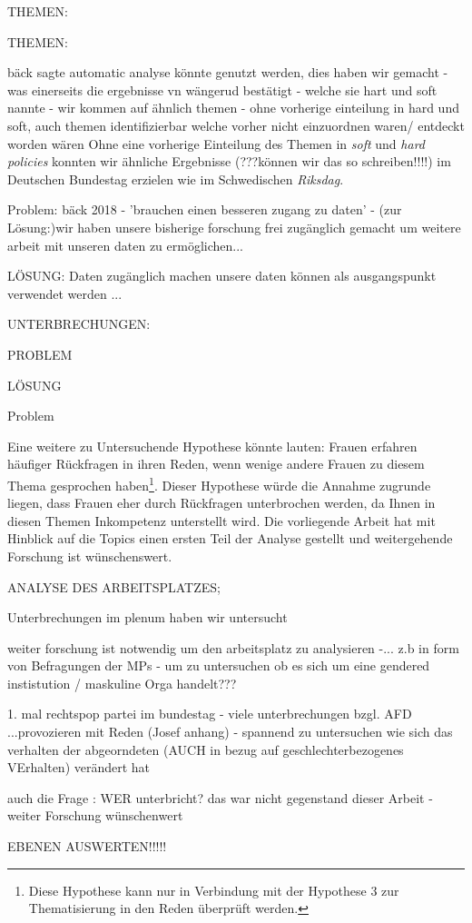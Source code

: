 \documentclass[12pt, 
    twoside=false, 
    bibliography=totoc, 
    numbers=endperiod, 
    headings=normal, 
    toc=chapterentrydotfill
    ]{scrbook}
\begin{document}
{THEMEN: 

THEMEN: 


bäck sagte automatic analyse könnte genutzt werden, dies haben wir gemacht - was einerseits die ergebnisse vn wängerud bestätigt - welche sie hart und soft nannte - wir kommen auf ähnlich themen - ohne vorherige einteilung in hard und soft, auch themen identifizierbar welche vorher nicht einzuordnen waren/ entdeckt worden wären
Ohne eine vorherige Einteilung des Themen in \emph{soft} und \emph{hard policies} konnten wir ähnliche Ergebnisse (???können wir das so schreiben!!!!) im Deutschen Bundestag erzielen wie \textcites[505]{back_2014} im Schwedischen \emph{Riksdag}\parencite[vgl. auch][]{wangnerud_1996}. 





Problem:
bäck 2018 - 'brauchen einen besseren zugang zu daten' - (zur Lösung:)wir haben unsere bisherige forschung frei zugänglich gemacht um weitere arbeit mit unseren daten zu ermöglichen... 

LÖSUNG:
Daten zugänglich machen 
unsere daten können als ausgangspunkt verwendet werden ... 



UNTERBRECHUNGEN:

PROBLEM

LÖSUNG 

Problem

Eine weitere zu Untersuchende Hypothese könnte lauten: {Frauen erfahren häufiger Rückfragen in ihren Reden, wenn wenige andere Frauen zu diesem Thema gesprochen haben}\footnote{Diese Hypothese kann nur in Verbindung mit der Hypothese 3 zur Thematisierung in den Reden überprüft werden.}. Dieser Hypothese würde die Annahme zugrunde liegen, dass Frauen eher durch Rückfragen unterbrochen werden, da Ihnen in diesen Themen Inkompetenz unterstellt wird. Die vorliegende Arbeit hat mit Hinblick auf die Topics einen ersten Teil der Analyse gestellt und weitergehende Forschung ist wünschenswert.


ANALYSE DES ARBEITSPLATZES; 

 Unterbrechungen im plenum haben wir untersucht  

weiter forschung ist notwendig um den arbeitsplatz zu analysieren -... z.b in form von Befragungen der MPs  - um zu untersuchen ob es sich um eine gendered instistution / maskuline Orga handelt??? 

1. mal rechtspop partei im bundestag - viele unterbrechungen bzgl. AFD ...provozieren mit Reden (Josef anhang) - spannend zu untersuchen wie sich das verhalten der abgeorndeten (AUCH in bezug auf geschlechterbezogenes VErhalten) verändert hat

auch die Frage : WER unterbricht? das war nicht gegenstand dieser Arbeit - weiter Forschung wünschenwert 

EBENEN AUSWERTEN!!!!!

}
\end{document}
